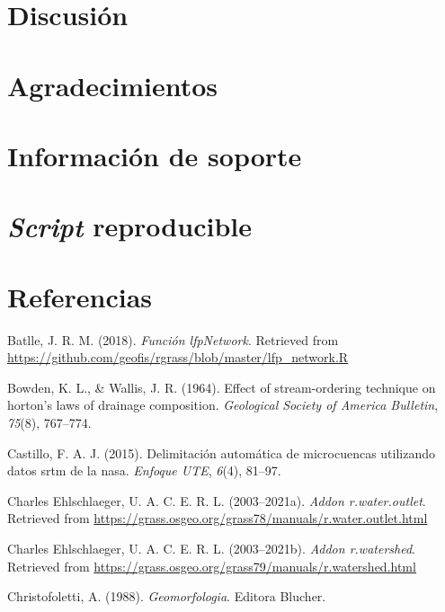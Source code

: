 \documentclass[11pt,]{article}
\begin{document}
\section{Discusión}\label{discusiuxf3n}

\section{Agradecimientos}\label{agradecimientos}

\section{Información de soporte}\label{informaciuxf3n-de-soporte}

\section{\texorpdfstring{\emph{Script}
reproducible}{Script reproducible}}\label{script-reproducible}

\section*{Referencias}\label{referencias}

\hypertarget{refs}{}
\hypertarget{ref-lfpnetjose}{}
Batlle, J. R. M. (2018). \emph{Función lfpNetwork}. Retrieved from
\url{https://github.com/geofis/rgrass/blob/master/lfp_network.R}

\hypertarget{ref-bowden1964effect}{}
Bowden, K. L., \& Wallis, J. R. (1964). Effect of stream-ordering
technique on horton's laws of drainage composition. \emph{Geological
Society of America Bulletin}, \emph{75}(8), 767--774.

\hypertarget{ref-castillo2015delimitacion}{}
Castillo, F. A. J. (2015). Delimitación automática de microcuencas
utilizando datos srtm de la nasa. \emph{Enfoque UTE}, \emph{6}(4),
81--97.

\hypertarget{ref-wateroutlet}{}
Charles Ehlschlaeger, U. A. C. E. R. L. (2003--2021a). \emph{Addon
r.water.outlet}. Retrieved from
\url{https://grass.osgeo.org/grass78/manuals/r.water.outlet.html}

\hypertarget{ref-watershedcharles}{}
Charles Ehlschlaeger, U. A. C. E. R. L. (2003--2021b). \emph{Addon
r.watershed}. Retrieved from
\url{https://grass.osgeo.org/grass79/manuals/r.watershed.html}

\hypertarget{ref-christofoletti1988geomorfologia}{}
Christofoletti, A. (1988). \emph{Geomorfologia}. Editora Blucher.
\end{document}
